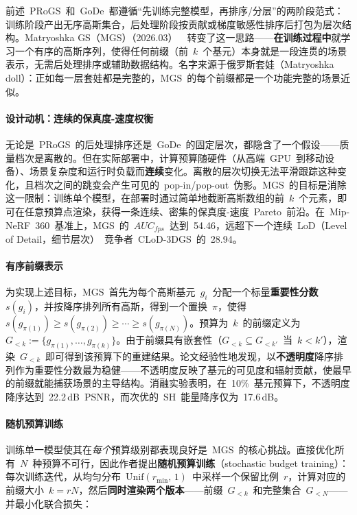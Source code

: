 前述~PRoGS~和~GoDe~都遵循``先训练完整模型，再排序/分层''的两阶段范式：训练阶段产出无序高斯集合，后处理阶段按贡献或梯度敏感性排序后打包为层次结构。Matryoshka GS（MGS）（2026.03）~\cite{2603_19234}~转变了这一思路——\textbf{在训练过程中}就学习一个有序的高斯序列，使得任何前缀（前~$k$~个基元）本身就是一段连贯的场景表示，无需后处理排序或辅助数据结构。名字来源于俄罗斯套娃（Matryoshka doll）：正如每一层套娃都是完整的，MGS~的每个前缀都是一个功能完整的场景近似。

\paragraph{设计动机：连续的保真度-速度权衡}

无论是~PRoGS~的后处理排序还是~GoDe~的固定层次，都隐含了一个假设——质量档次是离散的。但在实际部署中，计算预算随硬件（从高端~GPU~到移动设备）、场景复杂度和运行时负载而\textbf{连续}变化。离散的层次切换无法平滑跟踪这种变化，且档次之间的跳变会产生可见的~pop-in/pop-out~伪影。MGS~的目标是消除这一限制：训练单个模型，在部署时通过简单地截断高斯数组的前~$k$~个元素，即可在任意预算点渲染，获得一条连续、密集的保真度-速度~Pareto~前沿。在~Mip-NeRF~360~基准上，MGS~的~$AUC_{fps}$~达到~54.46，远超下一个连续~LoD（Level of Detail，细节层次）~竞争者~CLoD-3DGS~的~28.94。

\paragraph{有序前缀表示}

为实现上述目标，MGS~首先为每个高斯基元~$g_i$~分配一个标量\textbf{重要性分数}~$s(g_i)$，并按降序排列所有高斯，得到一个置换~$\pi$，使得~$s(g_{\pi(1)}) \geq s(g_{\pi(2)}) \geq \cdots \geq s(g_{\pi(N)})$。预算为~$k$~的前缀定义为~$G_{<k} := \{g_{\pi(1)}, \ldots, g_{\pi(k)}\}$。由于前缀具有嵌套性（$G_{<k} \subseteq G_{<k'}$~当~$k < k'$），渲染~$G_{<k}$~即可得到该预算下的重建结果。论文经验性地发现，以\textbf{不透明度}降序排列作为重要性分数最为稳健——不透明度反映了基元的可见度和辐射贡献，使最早的前缀就能捕获场景的主导结构。消融实验表明，在~10\%~基元预算下，不透明度降序达到~22.2\,dB~PSNR，而次优的~SH~能量降序仅为~17.6\,dB。

\paragraph{随机预算训练}

训练单一模型使其在\emph{每个}预算级别都表现良好是~MGS~的核心挑战。直接优化所有~$N$~种预算不可行，因此作者提出\textbf{随机预算训练}（stochastic budget training）：每次训练迭代，从均匀分布~$\text{Unif}(r_{\min},\,1)$~中采样一个保留比例~$r$，计算对应的前缀大小~$k = rN$，然后\textbf{同时渲染两个版本}——前缀~$G_{<k}$~和完整集合~$G_{<N}$——并最小化联合损失：

